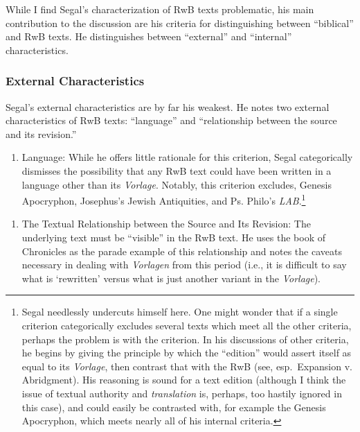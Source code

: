While I find Segal's characterization of RwB texts problematic, his main
contribution to the discussion are his criteria for distinguishing
between ``biblical'' and RwB texts. He distinguishes between
``external'' and ``internal'' characteristics.

\hypertarget{external-characteristics}{%
\subsubsection{External
Characteristics}\label{external-characteristics}}

Segal's external characteristics are by far his weakest. He notes two
external characteristics of RwB texts: ``language'' and ``relationship
between the source and its revision.''

\begin{enumerate}
\def\labelenumi{\arabic{enumi}.}
\tightlist
\item
  Language: While he offers little rationale for this criterion, Segal
  categorically dismisses the possibility that any RwB text could have
  been written in a language other than its \emph{Vorlage}. Notably,
  this criterion excludes, Genesis Apocryphon, Josephus's
  Jewish Antiquities, and Ps. Philo's \emph{LAB}.\footnote{Segal
    needlessly undercuts himself here. One might wonder that if a single
    criterion categorically excludes several texts which meet all the
    other criteria, perhaps the problem is with the criterion. In his
    discussions of other criteria, he begins by giving the principle by
    which the ``edition'' would assert itself as equal to its
    \emph{Vorlage}, then contrast that with the RwB (see, esp.~Expansion
    v. Abridgment). His reasoning is sound for a text edition (although
    I think the issue of textual authority and \emph{translation} is,
    perhaps, too hastily ignored in this case), and could easily be
    contrasted with, for example the Genesis Apocryphon, which meets
    nearly all of his internal criteria.}
\end{enumerate}

\begin{enumerate}
\def\labelenumi{\arabic{enumi}.}
\setcounter{enumi}{1}
\tightlist
\item
  The Textual Relationship between the Source and Its Revision: The
  underlying text must be ``visible'' in the RwB text. He uses the book
  of Chronicles as the parade example of this relationship and notes the
  caveats necessary in dealing with \emph{Vorlagen} from this period
  (i.e., it is difficult to say what is `rewritten' versus what is just
  another variant in the \emph{Vorlage}).
\end{enumerate}


